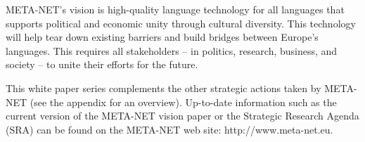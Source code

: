 \documentclass[]{../../metanetpaper}
\begin{document}
\begin{multicols}{2}
META-NET’s vision is high-quality language technology for all languages that supports political and economic unity through cultural diversity. This technology will help tear down existing barriers and build bridges between Europe’s languages. This requires all stakeholders -- in politics, research, business, and society -- to unite their efforts for the future.

This white paper series complements the other strategic actions taken by META-NET (see the appendix for an overview). Up-to-date information such as the current version of the META-NET vision paper \cite{Meta1} or the Strategic Research Agenda (SRA) can be found on the META-NET web site: http://www.meta-net.eu.
\end{multicols}

\clearpage


\end{document}
